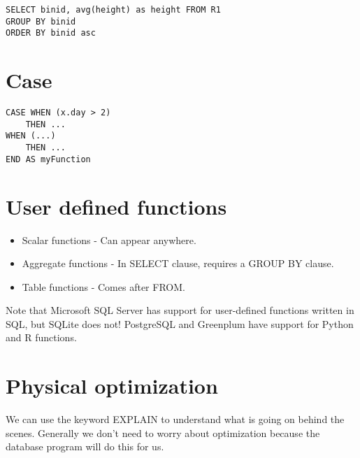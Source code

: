 \documentclass{article}
\begin{document}
\begin{verbatim}
SELECT binid, avg(height) as height FROM R1
GROUP BY binid
ORDER BY binid asc
\end{verbatim}

\section{Case}

\begin{verbatim}
CASE WHEN (x.day > 2)
	THEN ...
WHEN (...)
	THEN ...
END AS myFunction
\end{verbatim}

\section{User defined functions}

\begin{itemize}
\item Scalar functions - Can appear anywhere.
\item Aggregate functions - In SELECT clause, requires a GROUP BY clause.
\item Table functions - Comes after FROM.
\end{itemize}

Note that Microsoft SQL Server has support for user-defined functions written in SQL, but SQLite does not! PostgreSQL and Greenplum have support for Python and R functions.

\section{Physical optimization}

We can use the keyword EXPLAIN to understand what is going on behind the scenes. Generally we don't need to worry about optimization because the database program will do this for us.
\end{document}
